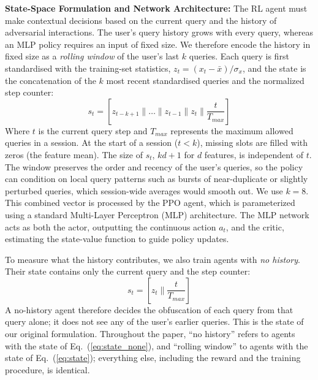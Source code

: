 \documentclass[conference]{IEEEtran}
\DeclareRobustCommand{\rev}[1]{#1}
\DeclareRobustCommand{\revnew}[1]{#1}
\begin{document}
\textbf{State-Space Formulation and Network Architecture:}
The RL agent must make contextual decisions based on the current query and the history of adversarial interactions. \rev{\revnew{The user's query history grows with every query}, whereas an MLP policy requires an input of fixed size. We therefore encode the history in fixed size as a \emph{rolling window} of the user's last $k$ queries. Each query is first standardised with the training-set statistics, $z_t = (x_t - \bar{x})/\sigma_x$, and the state is the concatenation of the $k$ most recent standardised queries and the normalized step counter:}
\begin{equation}
\rev{s_t = \left[z_{t-k+1} \parallel \dots \parallel z_{t-1} \parallel z_t \parallel \frac{t}{T_{max}}\right]}
\label{eq:state}
\end{equation}
Where $t$ is the current query step and $T_{max}$ represents the maximum allowed queries in a session. \rev{At the start of a session ($t<k$), missing slots are filled with zeros (the feature mean). The size of $s_t$, $kd+1$ for $d$ features, is independent of $t$. The window preserves the order and recency of the user's queries, so the policy can condition on local query patterns such as bursts of near-duplicate or slightly perturbed queries, which session-wide averages would smooth out. We use $k=8$.} This combined vector is processed by the PPO agent, which is parameterized using a standard Multi-Layer Perceptron (MLP) architecture. The MLP network acts as both the actor, outputting the continuous action $a_t$, and the critic, estimating the state-value function to guide policy updates.

\revnew{To measure what the history contributes, we also train agents with \emph{no history}. Their state contains only the current query and the step counter:
\begin{equation}
s_t = \left[z_t \parallel \frac{t}{T_{max}}\right]
\label{eq:state_none}
\end{equation}
A no-history agent therefore decides the obfuscation of each query from that query alone; it does not see any of the user's earlier queries. This is the state of our original formulation. Throughout the paper, ``no history'' refers to agents with the state of Eq.~(\ref{eq:state_none}), and ``rolling window'' to agents with the state of Eq.~(\ref{eq:state}); everything else, including the reward and the training procedure, is identical.}
\end{document}
